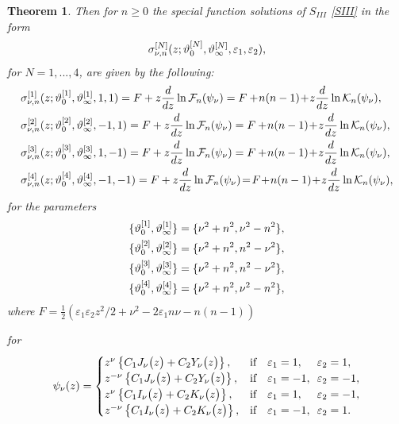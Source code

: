 \documentclass[12pt]{article}
\def\F{\mathcal{F}}
\def\K{\mathcal{K}}
\newtheorem{mydef}{Theorem}[section]
\numberwithin{figure}{section}
\numberwithin{equation}{section}
\numberwithin{table}{section}
\begin{document}
\begin{mydef}
Then for $n\geq0$ the special function solutions of $S_{III}$ \eqref{SIII} in the form $$\sigma^{[N]}_{\nu,n}(z;\vartheta_0^{[N]},\vartheta_\infty^{[N]},\varepsilon_1,\varepsilon_2),$$ for $N=1,...,4$, are given by the following:
\begin{subequations}
\begin{align*}
&\sigma^{[1]}_{\nu,n}(z;\th_0^{[1]},\th_\infty^{[1]},1,1)=F+z\frac{d}{dz}\ln\F_{n}(\psi_\nu)=
F+\!n(n-1)\!+\!z\frac{d}{dz}\ln\K_{n}(\psi_\nu),\\
&\sigma^{[2]}_{\nu,n}(z;\th_0^{[2]},\th_\infty^{[2]},-1,1)=F+z\frac{d}{dz}\ln\F_{n}(\psi_\nu)=
F+\!n(n-1)\!+\!z\frac{d}{dz}\ln\K_{n}(\psi_\nu),\\
&\sigma^{[3]}_{\nu,n}(z;\th_0^{[3]},\th_\infty^{[3]},1,-1)=F+z\frac{d}{dz}\ln\F_{n}(\psi_\nu)=
F+\!n(n-1)\!+\!z\frac{d}{dz}\ln\K_{n}(\psi_\nu),\\
&\sigma^{[4]}_{\nu,n}(z;\th_0^{[4]},\th_\infty^{[4]},-1,-1)=F+z\frac{d}{dz}\ln\F_{n}(\psi_\nu)\!=
\!F\!+\!n(n-1)\!+\!z\frac{d}{dz}\ln\K_{n}(\psi_\nu),
\end{align*}
\end{subequations}
for the parameters
\begin{subequations}
\begin{align*}
\{\vartheta_0^{[1]},\vartheta_\infty^{[1]}\}&=\{\nu^2+n^2,\nu^2-n^2\},\\
\{\vartheta_0^{[2]},\vartheta_\infty^{[2]}\}&=\{\nu^2+n^2,n^2-\nu^2\},\\
\{\vartheta_0^{[3]},\vartheta_\infty^{[3]}\}&=\{\nu^2+n^2,n^2-\nu^2\},\\
\{\vartheta_0^{[4]},\vartheta_\infty^{[4]}\}&=\{\nu^2+n^2,\nu^2-n^2\},
\end{align*}
\end{subequations}
where $F=\tfrac{1}{2}(\varepsilon_1\varepsilon_2z^2/2+\nu^2-2\varepsilon_1n\nu-n(n-1))$

for
$$\psi_{\nu}(z)=\begin{cases}
z^{\nu}\left\{C_1J_{\nu}\big(z\big)+C_2Y_{\nu}\big(z\big)\right\},&\mbox{\rm if}\quad \varepsilon_1=1,\phantom{-}\enskip\varepsilon_2=1,\\
z^{-\nu}\left\{C_1J_{\nu}\big(z\big)+C_2Y_{\nu}\big(z\big)\right\},&\mbox{\rm if}\quad \varepsilon_1=-1,\enskip\varepsilon_2=-1,\\
z^{\nu}\left\{C_1I_{\nu}\big(z\big)+C_2K_{\nu}\big(z\big)\right\},&\mbox{\rm if}\quad\varepsilon_1=1,\phantom{-}\enskip\varepsilon_2=-1,\\
z^{-\nu}\left\{C_1I_{\nu}\big(z\big)+C_2K_{\nu}\big(z\big)\right\},&\mbox{\rm if}\quad\varepsilon_1=-1,\enskip\varepsilon_2=1.
\end{cases}
$$
\end{mydef}
\end{document}
